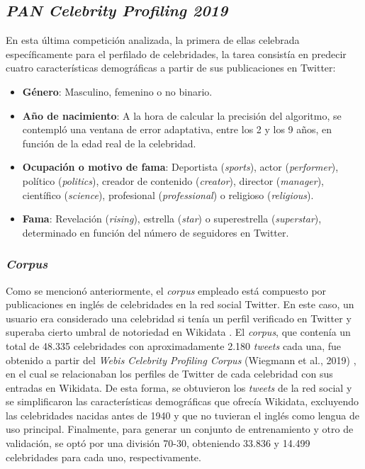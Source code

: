 \subsection{\textit{PAN Celebrity Profiling 2019}}

En esta última competición analizada, la primera de ellas celebrada específicamente para el perfilado de celebridades, la tarea consistía en predecir
cuatro características demográficas a partir de sus publicaciones en Twitter:

\begin{itemize}
	\item \textbf{Género}: Masculino, femenino o no binario.
	\item \textbf{Año de nacimiento}: A la hora de calcular la precisión del algoritmo,
	      se contempló una ventana de error adaptativa, entre los 2 y los 9 años, en función de la edad real de la celebridad.
	\item \textbf{Ocupación o motivo de fama}: Deportista (\textit{sports}), actor (\textit{performer}), político (\textit{politics}), creador de contenido (\textit{creator}),
	      director (\textit{manager}), científico (\textit{science}), profesional (\textit{professional}) o religioso (\textit{religious}).
	\item \textbf{Fama}: Revelación (\textit{rising}), estrella (\textit{star}) o superestrella (\textit{superstar}), determinado en función del número de seguidores en Twitter.
\end{itemize}

\subsubsection{\textit{Corpus}}

Como se mencionó anteriormente, el \textit{corpus} empleado está compuesto por publicaciones en inglés de celebridades en la red social Twitter.
En este caso, un usuario era considerado una celebridad si tenía un perfil verificado en Twitter y superaba cierto umbral
de notoriedad en Wikidata \cite{wikidata}. El \textit{corpus},
que contenía un total de 48.335 celebridades con aproximadamente 2.180 \textit{tweets} cada una, fue obtenido
a partir del \textit{Webis Celebrity Profiling Corpus} (Wiegmann et al., 2019) \cite{wiegmann2019celebrity}, en el cual se relacionaban los perfiles
de Twitter de cada celebridad con sus entradas en Wikidata. De esta forma, se obtuvieron los \textit{tweets} de la red social
y se simplificaron las características demográficas que ofrecía Wikidata, excluyendo las celebridades nacidas antes de 1940 y que no tuvieran
el inglés como lengua de uso principal. Finalmente, para generar un conjunto de entrenamiento y otro de validación, se optó por una división
70-30, obteniendo 33.836 y 14.499 celebridades para cada uno, respectivamente.

